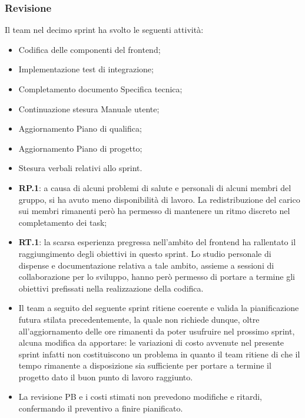 \documentclass[10pt, a4paper]{article}
\begin{document}
\subsubsection{Revisione}
Il team nel decimo sprint ha svolto le seguenti attività:
\begin{itemize}
    \item Codifica delle componenti del frontend;
    \item Implementazione test di integrazione;
    \item Completamento documento Specifica tecnica;
    \item Continuazione stesura Manuale utente;
    \item Aggiornamento Piano di qualifica;
    \item Aggiornamento Piano di progetto;
    \item Stesura verbali relativi allo sprint.
\end{itemize}
\begin{itemize}
    \item \textbf{RP.1}: a causa di alcuni problemi di salute e personali di alcuni membri del gruppo, si ha avuto meno disponibilità di lavoro. La redistribuzione del carico sui membri rimanenti però ha permesso di mantenere un ritmo discreto nel completamento dei task;
    \item \textbf{RT.1}: la scarsa esperienza pregressa nell'ambito del frontend ha rallentato il raggiungimento degli obiettivi in questo sprint. Lo studio personale di dispense e documentazione relativa a tale ambito, assieme a sessioni di collaborazione per lo sviluppo, hanno però permesso di portare a termine gli obiettivi prefissati nella realizzazione della codifica.
\end{itemize}
\begin{itemize}
    \item Il team a seguito del seguente sprint ritiene coerente e valida la pianificazione futura stilata precedentemente, la quale non richiede dunque, oltre all'aggiornamento delle ore rimanenti da poter usufruire nel prossimo sprint, alcuna modifica da apportare: le variazioni di costo avvenute nel presente sprint infatti non costituiscono un problema in quanto il team ritiene di che il tempo rimanente a disposizione sia sufficiente per portare a termine il progetto dato il buon punto di lavoro raggiunto.
\end{itemize}
\begin{itemize}
    \item La revisione PB e i costi stimati non prevedono modifiche e ritardi, confermando il preventivo a finire pianificato.
\end{itemize}
\end{document}
